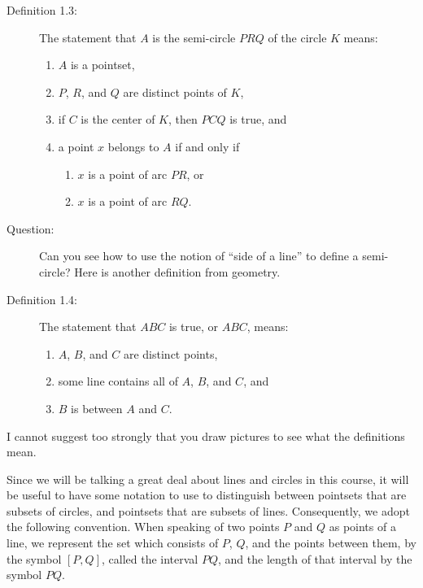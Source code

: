 \documentclass[english]{book}
\begin{document}
\begin{description}

\item[Definition 1.3:] The statement that $A$ is the semi-circle $PRQ$ of the circle $K$ means:
  \begin{enumerate}[\hspace{1cm}1)]
    \item $A$ is a pointset,
    \item $P$, $R$, and $Q$ are distinct points of $K$,
    \item if $C$ is the center of $K$, then $PCQ$ is true, and
    \item a point $x$ belongs to $A$ if and only if
    \begin{enumerate}[\hspace{1cm}(a)]
      \item $x$ is a point of arc $PR$, or
      \item $x$ is a point of arc $RQ$.
    \end{enumerate}
  \end{enumerate}

\item[Question:] Can you see how to use the notion of ``side of a line'' to define a semi-circle? Here is another definition from geometry.

\item[Definition 1.4:] The statement that $ABC$ is true, or $ABC$, means:
  \begin{enumerate}[\hspace{1cm}1)]
    \item $A$, $B$, and $C$ are distinct points,
    \item some line contains all of $A$, $B$, and $C$, and
    \item $B$ is between $A$ and $C$.
  \end{enumerate}

\end{description}

I cannot suggest too strongly that you draw pictures to see what the definitions mean.

Since we will be talking a great deal about lines and circles in this course, it will be useful to have some notation to use to distinguish between pointsets that are subsets of circles, and pointsets that are subsets of lines. Consequently, we adopt the following convention. When speaking of two points $P$ and $Q$ as points of a line, we represent the set which consists of $P$, $Q$, and the points between them, by the symbol $[P,Q]$, called the interval $PQ$, and the length of that interval by the symbol $PQ$.
\end{document}
